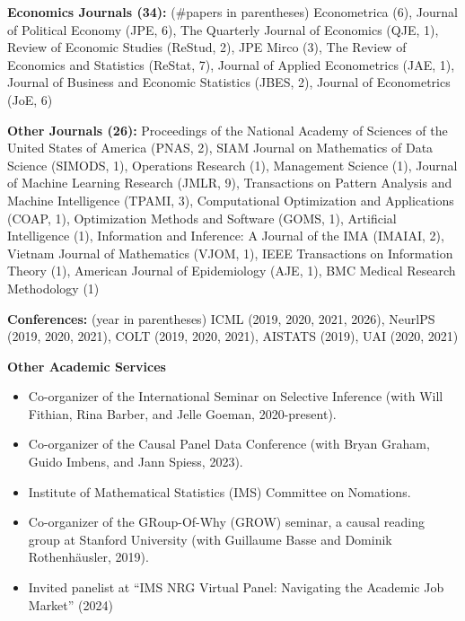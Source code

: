 \documentclass{article}
\begin{document}
\vspace{2mm}
\noindent \textbf{Economics Journals (34): }(\#papers in parentheses) Econometrica (6), Journal of Political Economy (JPE, 6), The Quarterly Journal of Economics (QJE, 1), Review of Economic Studies (ReStud, 2), JPE Mirco (3), The Review of Economics and Statistics (ReStat, 7), Journal of Applied Econometrics (JAE, 1), Journal of Business and Economic Statistics (JBES, 2), Journal of Econometrics (JoE, 6)

\vspace{2mm}
\noindent \textbf{Other Journals (26): } Proceedings of the National Academy of Sciences of the United States of America (PNAS, 2), SIAM Journal on Mathematics of Data Science (SIMODS, 1), Operations Research (1), Management Science (1), Journal of Machine Learning Research (JMLR, 9), Transactions on Pattern Analysis and Machine Intelligence (TPAMI, 3), Computational Optimization and Applications (COAP, 1), Optimization Methods and Software (GOMS, 1), Artificial Intelligence (1), Information and Inference: A Journal of the IMA (IMAIAI, 2), Vietnam Journal of Mathematics (VJOM, 1), IEEE Transactions on Information Theory (1), American Journal of Epidemiology (AJE, 1), BMC Medical Research Methodology (1)

\vspace{2mm}
\noindent \textbf{Conferences: }(year in parentheses) ICML (2019, 2020, 2021, 2026), NeurlPS (2019, 2020, 2021), COLT (2019, 2020, 2021), AISTATS (2019), UAI (2020, 2021)

\vspace{7mm}
\begin{large}
\noindent \textbf{Other Academic Services}
\end{large}

\begin{itemize}  
\item Co-organizer of the International Seminar on Selective Inference (with Will Fithian, Rina Barber, and Jelle Goeman, 2020-present).
\item Co-organizer of the Causal Panel Data Conference (with Bryan Graham, Guido Imbens, and Jann Spiess, 2023).
\item Institute of Mathematical Statistics (IMS) Committee on Nomations. 
\item Co-organizer of the GRoup-Of-Why (GROW) seminar, a causal reading group at Stanford University (with Guillaume Basse and Dominik Rothenhäusler, 2019).
\item Invited panelist at ``IMS NRG Virtual Panel: Navigating the Academic Job Market'' (2024)
\end{itemize}
\end{document}
